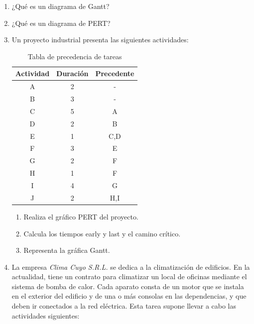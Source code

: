 \documentclass[../main]{subfiles}
\begin{document}
\begin{enumerate}
\item ¿Qué es un diagrama de Gantt?
\item ¿Qué es un diagrama de PERT?
\item Un proyecto industrial presenta las siguientes actividades:
\begin{table}[h!]
    \centering
    \begin{tabular}{|c|c|c|} \hline
         Actividad & Duración & Precedente  \\ \hline \hline 
         A & 2 & -\\
         B & 3 & -\\
         C & 5 & A\\
     D & 2 & B\\
     E & 1 & C,D\\
     F & 3 & E\\
     G & 2 & F\\
     H & 1 & F\\
     I & 4 & G\\
     J & 2 & H,I\\ \hline
    \end{tabular}
    \caption{Tabla de precedencia de tareas}
    \label{tab:my_label}
\end{table}
\begin{enumerate}
    \item Realiza el gráfico PERT del proyecto.
    \item Calcula los tiempos early y last y el camino crítico.
    \item Representa la gráfica Gantt. 
\end{enumerate}

\item La empresa \emph{Clima Cuyo S.R.L.} se dedica a la climatización de edificios. En la actualidad, tiene un contrato para
climatizar un local de oficinas mediante el sistema de bomba de calor. Cada aparato consta de un motor que se instala en el
exterior del edificio y de una o más consolas en las dependencias, y que deben ir conectados a la red eléctrica. Esta tarea
supone llevar a cabo las actividades siguientes:


\end{enumerate}
\end{document}
